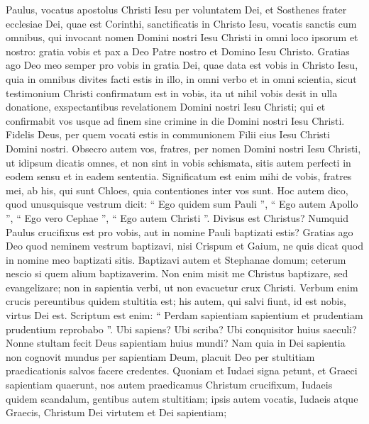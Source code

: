 \begin{biblechapter}
 \verse Paulus, vocatus apostolus Christi Iesu per voluntatem Dei, et Sosthenes frater 
\verse ecclesiae Dei, quae est Corinthi, sanctificatis in Christo Iesu, vocatis sanctis cum omnibus, qui invocant nomen Domini nostri Iesu Christi in omni loco ipsorum et nostro: 
\verse gratia vobis et pax a Deo Patre nostro et Domino Iesu Christo.
 \verse Gratias ago Deo meo semper pro vobis in gratia Dei, quae data est vobis in Christo Iesu, 
\verse quia in omnibus divites facti estis in illo, in omni verbo et in omni scientia, 
\verse sicut testimonium Christi confirmatum est in vobis, 
 \verse ita ut nihil vobis desit in ulla donatione, exspectantibus revelationem Domini nostri Iesu Christi; 
\verse qui et confirmabit vos usque ad finem sine crimine in die Domini nostri Iesu Christi. 
\verse Fidelis Deus, per quem vocati estis in communionem Filii eius Iesu Christi Domini nostri.
 \verse Obsecro autem vos, fratres, per nomen Domini nostri Iesu Christi, ut idipsum dicatis omnes, et non sint in vobis schismata, sitis autem perfecti in eodem sensu et in eadem sententia. 
\verse Significatum est enim mihi de vobis, fratres mei, ab his, qui sunt Chloes, quia contentiones inter vos sunt. 
\verse Hoc autem dico, quod unusquisque vestrum dicit: “ Ego quidem sum Pauli ”, “ Ego autem Apollo ”, “ Ego vero Cephae ”, “ Ego autem Christi ”.
 \verse Divisus est Christus? Numquid Paulus crucifixus est pro vobis, aut in nomine Pauli baptizati estis? 
\verse Gratias ago Deo quod neminem vestrum baptizavi, nisi Crispum et Gaium, 
\verse ne quis dicat quod in nomine meo baptizati sitis. 
 \verse Baptizavi autem et Stephanae domum; ceterum nescio si quem alium baptizaverim. 
\verse Non enim misit me Christus baptizare, sed evangelizare; non in sapientia verbi, ut non evacuetur crux Christi.
 \verse Verbum enim crucis pereuntibus quidem stultitia est; his autem, qui salvi fiunt, id est nobis, virtus Dei est. 
\verse Scriptum est enim:
 “ Perdam sapientiam sapientium
 et prudentiam prudentium reprobabo ”.
 \verse Ubi sapiens? Ubi scriba? Ubi conquisitor huius saeculi? Nonne stultam fecit Deus sapientiam huius mundi? 
\verse Nam quia in Dei sapientia non cognovit mundus per sapientiam Deum, placuit Deo per stultitiam praedicationis salvos facere credentes. 
\verse Quoniam et Iudaei signa petunt, et Graeci sapientiam quaerunt, 
\verse nos autem praedicamus Christum crucifixum, Iudaeis quidem scandalum, gentibus autem stultitiam; 
\verse ipsis autem vocatis, Iudaeis atque Graecis, Christum Dei virtutem et Dei sapientiam; 

\end{biblechapter}
